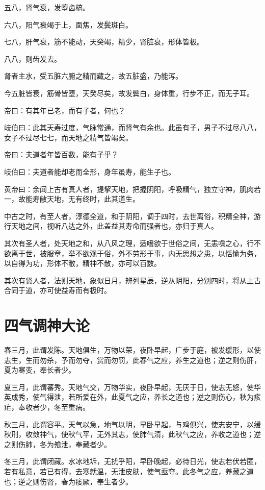 \documentclass{article}%
\begin{document}
五八，肾气衰，发堕齿槁。

六八，阳气衰竭于上，面焦，发鬓斑白。

七八，肝气衰，筋不能动，天癸竭，精少，肾脏衰，形体皆极。

八八，则齿发去。

肾者主水，受五脏六腑之精而藏之，故五脏盛，乃能泻。

今五脏皆衰，筋骨皆堕，天癸尽矣，故发鬓白，身体重，行步不正，而无子耳。

帝曰：有其年已老，而有子者，何也？

岐伯曰：此其天寿过度，气脉常通，而肾气有余也。此虽有子，男子不过尽八八，女子不过尽七七，而天地之精气皆竭矣。

帝曰：夫道者年皆百数，能有子乎？

岐伯曰：夫道者能却老而全形，身年虽寿，能生子也。

黄帝曰：余闻上古有真人者，提挈天地，把握阴阳，呼吸精气，独立守神，肌肉若一，故能寿敝天地，无有终时，此其道生。

中古之时，有至人者，淳德全道，和于阴阳，调于四时，去世离俗，积精全神，游行天地之间，视听八达之外，此盖益其寿命而强者也，亦归于真人。

其次有圣人者，处天地之和，从八风之理，适嗜欲于世俗之间，无恚嗔之心，行不欲离于世，被服章，举不欲观于俗，外不劳形于事，内无思想之患，以恬愉为务，以自得为功，形体不敝，精神不散，亦可以百数。

其次有贤人者，法则天地，象似日月，辨列星辰，逆从阴阳，分别四时，将从上古合同于道，亦可使益寿而有极时。

\section{四气调神大论}
春三月，此谓发陈。天地俱生，万物以荣，夜卧早起，广步于庭，被发缓形，以使志生，生而勿杀，予而勿夺，赏而勿罚，此春气之应，养生之道也；逆之则伤肝，夏为寒变，奉长者少。

夏三月，此谓蕃秀。天地气交，万物华实，夜卧早起，无厌于日，使志无怒，使华英成秀，使气得泄，若所爱在外，此夏气之应，养长之道也；逆之则伤心，秋为痎疟，奉收者少，冬至重病。

秋三月，此谓容平。天气以急，地气以明，早卧早起，与鸡俱兴，使志安宁，以缓秋刑，收敛神气，使秋气平，无外其志，使肺气清，此秋气之应，养收之道也；逆之则伤肺，冬为飧泄，奉藏者少。

冬三月，此谓闭藏。水冰地坼，无扰乎阳，早卧晚起，必待日光，使志若伏若匿，若有私意，若已有得，去寒就温，无泄皮肤，使气亟夺。此冬气之应，养藏之道也；逆之则伤肾，春为痿厥，奉生者少。
\end{document}
